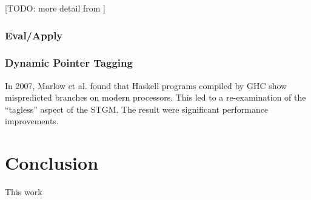 \documentclass[runningheads]{llncs}
\begin{document}
[TODO: more detail from  \cite{jones1999c}] 

\subsubsection{Eval/Apply}

\subsubsection{Dynamic Pointer Tagging}
In 2007, Marlow et al.\cite{marlow2007faster} found that Haskell programs compiled by GHC show mispredicted branches on modern processors. This led to a re-examination of the \enquote{tagless} aspect of the STGM. The result were significant performance improvements.


\section{Conclusion}
\label{sec:conclusion}

This work 


%
%
\newpage


\end{document}
